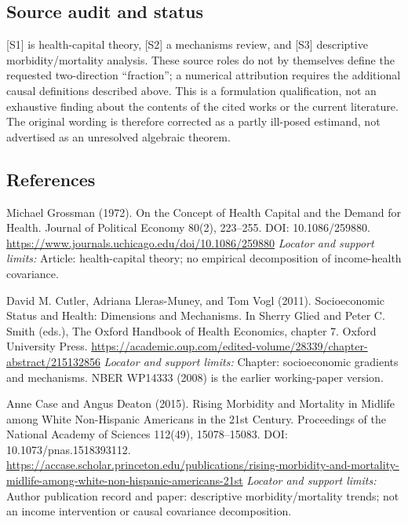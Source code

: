 \documentclass[11pt,a4paper]{article}
\begin{document}
\subsection*{Source audit and status}
[S1] is health-capital theory, [S2] a mechanisms review, and [S3] descriptive morbidity/mortality analysis. These source roles do not by themselves define the requested two-direction “fraction”; a numerical attribution requires the additional causal definitions described above. This is a formulation qualification, not an exhaustive finding about the contents of the cited works or the current literature. The original wording is therefore corrected as a partly ill-posed estimand, not advertised as an unresolved algebraic theorem.

\subsection*{References}
\begin{enumerate}[label={[S\arabic*]},leftmargin=*,itemsep=0.6em]
\item Michael Grossman (1972). On the Concept of Health Capital and the Demand for Health. Journal of Political Economy 80(2), 223--255. DOI: 10.1086/259880.
\url{https://www.journals.uchicago.edu/doi/10.1086/259880}
\newline\emph{Locator and support limits:} Article: health-capital theory; no empirical decomposition of income-health covariance.
\item David M. Cutler, Adriana Lleras-Muney, and Tom Vogl (2011). Socioeconomic Status and Health: Dimensions and Mechanisms. In Sherry Glied and Peter C. Smith (eds.), The Oxford Handbook of Health Economics, chapter 7. Oxford University Press.
\url{https://academic.oup.com/edited-volume/28339/chapter-abstract/215132856}
\newline\emph{Locator and support limits:} Chapter: socioeconomic gradients and mechanisms. NBER WP14333 (2008) is the earlier working-paper version.
\item Anne Case and Angus Deaton (2015). Rising Morbidity and Mortality in Midlife among White Non-Hispanic Americans in the 21st Century. Proceedings of the National Academy of Sciences 112(49), 15078--15083. DOI: 10.1073/pnas.1518393112.
\url{https://accase.scholar.princeton.edu/publications/rising-morbidity-and-mortality-midlife-among-white-non-hispanic-americans-21st}
\newline\emph{Locator and support limits:} Author publication record and paper: descriptive morbidity/mortality trends; not an income intervention or causal covariance decomposition.
\end{enumerate}
\end{document}
